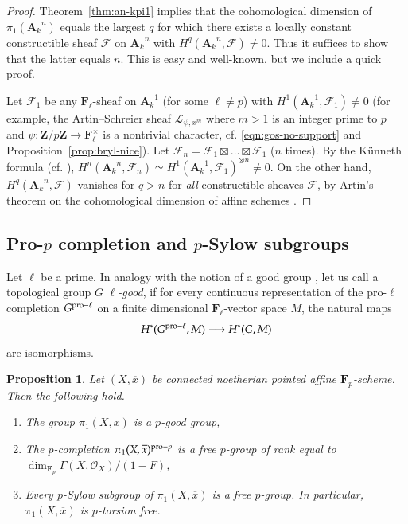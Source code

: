 \documentclass[twoside]{amsart}
\renewcommand{\AA}{\mathbf{A}}
\newcommand{\FF}{\mathbf{F}}
\newcommand{\ZZ}{\mathbf{Z}}
\newcommand{\Ff}{\mathscr{F}}
\newcommand{\Ll}{\mathscr{L}}
\newcommand{\Oo}{\mathscr{O}}
\newcommand{\ANK}[2]{{\AA_{#2}}^{\! \! \! \!  #1}} %
\newcommand{\AN}[1]{\ANK{#1}{k}}
\newcommand{\isom}{\simeq}
\renewcommand{\to}{\longrightarrow}
\renewcommand{\bar}{\overline}
\theoremstyle{plain}
\newtheorem{proposition}[subsubsection]{Proposition}
\theoremstyle{definition}
\theoremstyle{remark}
\numberwithin{equation}{subsection}
\begin{document}
\begin{proof}
Theorem~\ref{thm:an-kpi1} implies that the cohomological dimension of $\pi_1(\AN{n})$ equals the largest $q$ for which there exists a locally constant constructible sheaf $\Ff$ on $\AN{n}$ with $H^q(\AN{n}, \Ff)\neq 0$. Thus it suffices to show that the latter equals $n$. This is easy and well-known, but we include a quick proof.

Let $\Ff_1$ be any $\FF_\ell$-sheaf on $\AN{1}$ (for some $\ell\neq p$) with $H^1(\AN{1}, \Ff_1)\neq 0$ (for example, the Artin--Schreier sheaf $\Ll_{\psi, x^m}$ where $m>1$ is an integer prime to $p$ and $\psi\colon  \ZZ/p\ZZ\to \FF_\ell^\times$ is a nontrivial character, cf. \eqref{eqn:gos-no-support} and Proposition~\ref{prop:bryl-nice}).  Let $\Ff_n = \Ff_1\boxtimes \ldots \boxtimes \Ff_1$ ($n$ times). By the K\"unneth formula (cf. \cite[Th. finitude, Corollaire 1.11]{ThFinitude}), $H^n(\AN{n}, \Ff_n) \isom H^1(\AN{1}, \Ff_1)^{\otimes n}\neq 0$. On the other hand, $H^q(\AN{n}, \Ff)$ vanishes for $q>n$ for \emph{all} constructible sheaves $\Ff$, by Artin's theorem on the cohomological dimension of affine schemes \cite[Exp.~XIV, Corollaire~3.2]{Artin}.
\end{proof}

\subsection{Pro-$p$ completion and $p$-Sylow subgroups} \label{ss:pro-p}

Let $\ell$ be a prime. In analogy with the notion of a good group \cite[\S 2.6]{Serre}, let us call a topological group $G$ \emph{$\ell$-good}, if for every continuous representation of the pro-$\ell$ completion $G^{{\rm pro}-\ell}$ on a finite dimensional $\FF_\ell$-vector space $M$, the natural maps
\[ 
	H^*(G^{{\rm pro}-\ell}, M) \to H^*(G, M)
\]
are isomorphisms. 

\begin{proposition}
	Let $(X, \bar x)$ be connected noetherian pointed affine $\FF_p$-scheme. Then the following hold.
	\begin{enumerate}[(1)]
		\item The group $\pi_1(X, \bar x)$ is a $p$-good group,
		\item The $p$-completion $\pi_1(X, \bar x)^{{\rm pro}-p}$ is a free $p$-group of rank equal to $\dim_{\FF_p} \Gamma(X, \Oo_X)/(1-F)$,
		\item Every $p$-Sylow subgroup of $\pi_1(X, \bar x)$ is a free $p$-group. In particular, $\pi_1(X, \bar x)$ is $p$-torsion free. 
	\end{enumerate}
\end{proposition}
\end{document}
